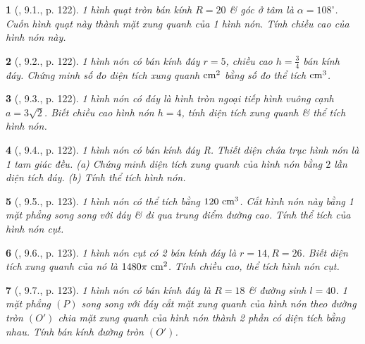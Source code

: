 \documentclass{article}
\newtheorem{baitoan}{}
\begin{document}
\begin{baitoan}[\cite{Binh_boi_duong_Toan_9_tap_2}, 9.1., p. 122]
	1 hình quạt tròn bán kính $R = 20$ \& góc ở tâm là $\alpha = 108^\circ$. Cuốn hình quạt này thành mặt xung quanh của 1 hình nón. Tính chiều cao của hình nón này.
\end{baitoan}

\begin{baitoan}[\cite{Binh_boi_duong_Toan_9_tap_2}, 9.2., p. 122]
	1 hình nón có bán kính đáy $r = 5$, chiều cao $h = \frac{3}{4}$ bán kính đáy. Chứng minh số đo diện tích xung quanh $\rm cm^2$ bằng số đo thể tích $\rm cm^3$.
\end{baitoan}

\begin{baitoan}[\cite{Binh_boi_duong_Toan_9_tap_2}, 9.3., p. 122]
	1 hình nón có đáy là hình tròn ngoại tiếp hình vuông cạnh $a = 3\sqrt{2}$. Biết chiều cao hình nón $h = 4$, tính diện tích xung quanh \& thể tích hình nón.
\end{baitoan}

\begin{baitoan}[\cite{Binh_boi_duong_Toan_9_tap_2}, 9.4., p. 122]
	1 hình nón có bán kính đáy R. Thiết diện chứa trục hình nón là 1 tam giác đều. (a) Chứng minh diện tích xung quanh của hình nón bằng $2$ lần diện tích đáy. (b) Tính thể tích hình nón.
\end{baitoan}

\begin{baitoan}[\cite{Binh_boi_duong_Toan_9_tap_2}, 9.5., p. 123]
	1 hình nón có thể tích bằng $\rm120\ cm^3$. Cắt hình nón này bằng 1 mặt phẳng song song với đáy \& đi qua trung điểm đường cao. Tính thể tích của hình nón cụt.
\end{baitoan}

\begin{baitoan}[\cite{Binh_boi_duong_Toan_9_tap_2}, 9.6., p. 123]
	1 hình nón cụt có 2 bán kính đáy là $r = 14,R = 26$. Biết diện tích xung quanh của nó là $\rm1480\pi\ cm^2$. Tính chiều cao, thể tích hình nón cụt.
\end{baitoan}

\begin{baitoan}[\cite{Binh_boi_duong_Toan_9_tap_2}, 9.7., p. 123]
	1 hình nón có bán kính đáy là $R = 18$ \& đường sinh $l = 40$. 1 mặt phẳng $(P)$ song song với đáy cắt mặt xung quanh của hình nón theo đường tròn $(O')$ chia mặt xung quanh của hình nón thành 2 phần có diện tích bằng nhau. Tính bán kính đường tròn $(O')$.
\end{baitoan}
\end{document}
